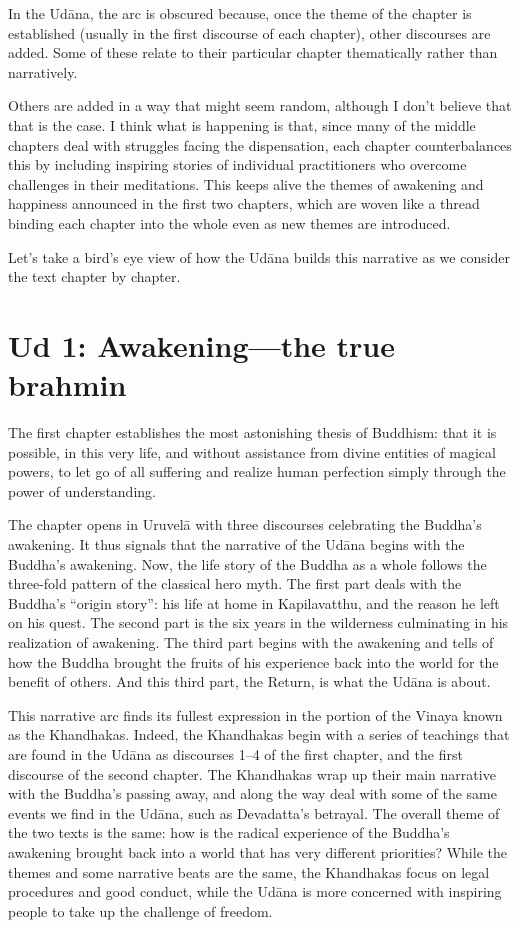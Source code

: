 \documentclass[12pt,openany]{book}%
\begin{document}
In the \textsanskrit{Udāna}, the arc is obscured because, once the theme of the chapter is established (usually in the first discourse of each chapter), other discourses are added. Some of these relate to their particular chapter thematically rather than narratively. 

Others are added in a way that might seem random, although I don’t believe that that is the case. I think what is happening is that, since many of the middle chapters deal with struggles facing the dispensation, each chapter counterbalances this by including inspiring stories of individual practitioners who overcome challenges in their meditations. This keeps alive the themes of awakening and happiness announced in the first two chapters, which are woven like a thread binding each chapter into the whole even as new themes are introduced.

Let’s take a bird’s eye view of how the \textsanskrit{Udāna} builds this narrative as we consider the text chapter by chapter. 

\section*{Ud 1: Awakening—the true brahmin}

The first chapter establishes the most astonishing thesis of Buddhism: that it is possible, in this very life, and without assistance from divine entities of magical powers, to let go of all suffering and realize human perfection simply through the power of understanding.

The chapter opens in \textsanskrit{Uruvelā} with three discourses celebrating the Buddha’s awakening. It thus signals that the narrative of the \textsanskrit{Udāna} begins with the Buddha’s awakening. Now, the life story of the Buddha as a whole follows the three-fold pattern of the classical hero myth. The first part deals with the Buddha’s “origin story”: his life at home in Kapilavatthu, and the reason he left on his quest. The second part is the six years in the wilderness culminating in his realization of awakening. The third part begins with the awakening and tells of how the Buddha brought the fruits of his experience back into the world for the benefit of others. And this third part, the Return, is what the \textsanskrit{Udāna} is about.

This narrative arc finds its fullest expression in the portion of the Vinaya known as the Khandhakas. Indeed, the Khandhakas begin with a series of teachings that are found in the \textsanskrit{Udāna} as discourses 1–4 of the first chapter, and the first discourse of the second chapter. The Khandhakas wrap up their main narrative with the Buddha’s passing away, and along the way deal with some of the same events we find in the \textsanskrit{Udāna}, such as Devadatta’s betrayal. The overall theme of the two texts is the same: how is the radical experience of the Buddha’s awakening brought back into a world that has very different priorities? While the themes and some narrative beats are the same, the Khandhakas focus on legal procedures and good conduct, while the \textsanskrit{Udāna} is more concerned with inspiring people to take up the challenge of freedom.
\end{document}
